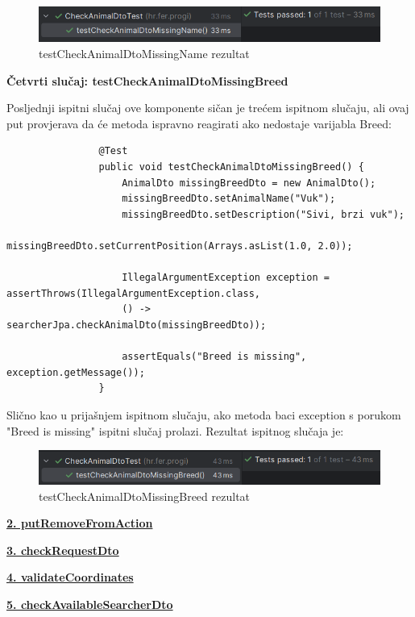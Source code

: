 			\begin{figure}[H]
				\includegraphics[scale=0.8]{slike/testCheckAnimalDtoMissingName.PNG} 
				\centering
				\caption{testCheckAnimalDtoMissingName rezultat}
				\label{fig:testCheckAnimalDtoMissingName}
			\end{figure}
			
			\noindent\textbf{Četvrti slučaj: testCheckAnimalDtoMissingBreed}
			
			Posljednji ispitni slučaj ove komponente sičan je trećem ispitnom slučaju, ali ovaj put provjerava da će metoda ispravno reagirati ako nedostaje varijabla Breed:
			\begin{lstlisting}
				@Test
				public void testCheckAnimalDtoMissingBreed() {
					AnimalDto missingBreedDto = new AnimalDto();
					missingBreedDto.setAnimalName("Vuk");
					missingBreedDto.setDescription("Sivi, brzi vuk");
					missingBreedDto.setCurrentPosition(Arrays.asList(1.0, 2.0));
					
					IllegalArgumentException exception = assertThrows(IllegalArgumentException.class,
					() -> searcherJpa.checkAnimalDto(missingBreedDto));
					
					assertEquals("Breed is missing", exception.getMessage());
				}
			\end{lstlisting}
			Slično kao u prijašnjem ispitnom slučaju, ako metoda baci exception s porukom "Breed is missing" ispitni slučaj prolazi. Rezultat ispitnog slučaja je:
			
			\begin{figure}[H]
				\includegraphics[scale=0.8]{slike/testCheckAnimalDtoMissingBreed.PNG} 
				\centering
				\caption{testCheckAnimalDtoMissingBreed rezultat}
				\label{fig:testCheckAnimalDtoMissingBreed}
			\end{figure}
			
			
			\underline{\textbf{2. putRemoveFromAction}}
			
			\underline{\textbf{3. checkRequestDto}}
			
			\underline{\textbf{4. validateCoordinates}}
			
			\underline{\textbf{5. checkAvailableSearcherDto}}
			
